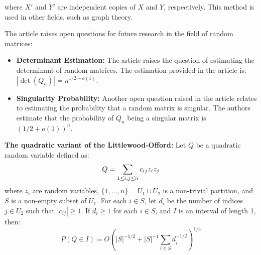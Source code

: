 where \( X' \) and \( Y' \) are independent copies of \( X \) and \( Y \), respectively. This method is used in other fields, such as graph theory.
\vspace{\baselineskip}

The article raises open questions for future research in the field of random matrices:

\begin{itemize}
    \item \textbf{Determinant Estimation:} The article raises the question of estimating the determinant of random matrices. The estimation provided in the article is: \( |\det(Q_n)| = n^{1/2-o(1)} \).
    \item \textbf{Singularity Probability:} Another open question raised in the article relates to estimating the probability that a random matrix is singular. The authors estimate that the probability of \( Q_n \) being a singular matrix is \( (1/2+o(1))^n \).
\end{itemize}

\vspace{\baselineskip}
\textbf{The quadratic variant of the Littlewood-Offord:}
Let \( Q \) be a quadratic random variable defined as:
\vspace{-0.8\baselineskip}
\[ Q = \sum_{1 \leq i,j \leq n} c_{ij} z_i z_j \vspace{-0.5\baselineskip} \]
where \( z_i \) are random variables, \( \{1,\ldots,n\} = U_1 \cup U_2 \) is a non-trivial partition, and \( S \) is a non-empty subset of \( U_1 \). For each \( i \in S \), let \( d_i \) be the number of indices \( j \in U_2 \) such that \( |c_{ij}| \geq 1 \). If \( d_i \geq 1 \) for each \( i \in S \), and \( I \) is an interval of length 1, then:
\vspace{-0.9\baselineskip}
\[ P(Q \in I) = O\left( |S|^{-1/2} + |S|^{-1} \sum_{i \in S} d_i^{-1/2} \right)^{1/4} \]

